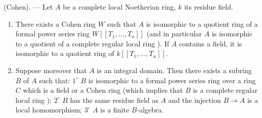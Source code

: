 \begin{theorem}[19.8.8]
\label{0.19.8.8}
\textup{(Cohen).} ---
Let $A$ be a complete local Noetherian ring, $k$ its residue field.
\begin{enumerate}
  \item[\rm(i)] There exists a Cohen ring $W$ such that $A$ is isomorphic to a quotient ring of a formal power series ring $W[[T_1,\ldots,T_n]]$ (and in particular $A$ is isomorphic to a quotient of a complete regular local ring ).
If $A$ contains a field, it is isomorphic to a quotient ring of $k[[T_1,\ldots,T_n]]$.
  \item[\rm(ii)] Suppose moreover that $A$ is an integral domain.
Then there exists a subring $B$ of $A$ such that: $1^\circ$ $B$ is isomorphic to a formal power series ring over a ring $C$ which is a field or a Cohen ring (which implies that $B$ is a complete regular local ring ); $2^\circ$ $B$ has the same residue field as $A$ and the injection $B\to A$ is a local homomorphism; $3^\circ$ $A$ is a finite $B$-algebra.
\end{enumerate}
\end{theorem}

